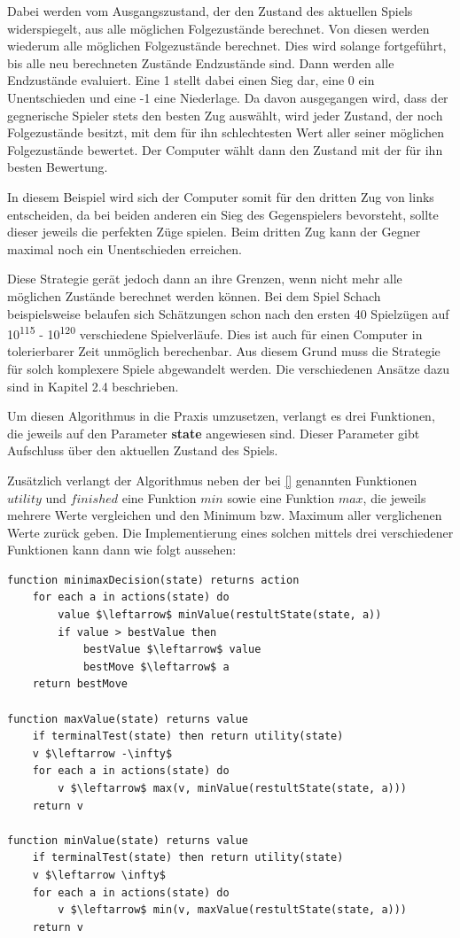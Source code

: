 Dabei werden vom Ausgangszustand, der den Zustand des aktuellen Spiels widerspiegelt, aus alle möglichen Folgezustände berechnet. Von diesen werden wiederum alle möglichen Folgezustände berechnet. Dies wird solange fortgeführt, bis alle neu berechneten Zustände Endzustände sind. Dann werden alle Endzustände evaluiert. Eine 1 stellt dabei einen Sieg dar, eine 0 ein Unentschieden und eine -1 eine Niederlage. Da davon ausgegangen wird, dass der gegnerische Spieler stets den besten Zug auswählt, wird jeder Zustand, der noch Folgezustände besitzt, mit dem für ihn schlechtesten Wert aller seiner möglichen Folgezustände bewertet. Der Computer wählt dann den Zustand mit der für ihn besten Bewertung.

In diesem Beispiel wird sich der Computer somit für den dritten Zug von links entscheiden, da bei beiden anderen ein Sieg des Gegenspielers bevorsteht, sollte dieser jeweils die perfekten Züge spielen. Beim dritten Zug kann der Gegner maximal noch ein Unentschieden erreichen.

Diese Strategie gerät jedoch dann an ihre Grenzen, wenn nicht mehr alle möglichen Zustände berechnet werden können. Bei dem Spiel Schach beispielsweise belaufen sich Schätzungen schon nach den ersten 40 Spielzügen auf 10\textsuperscript{115} - 10\textsuperscript{120} verschiedene Spielverläufe. Dies ist auch für einen Computer in tolerierbarer  Zeit unmöglich berechenbar. Aus diesem Grund muss die Strategie für solch komplexere Spiele abgewandelt werden. Die verschiedenen Ansätze dazu sind in Kapitel 2.4 beschrieben.


Um diesen Algorithmus in die Praxis umzusetzen, verlangt es drei Funktionen, die jeweils auf den Parameter \textbf{state} angewiesen sind. Dieser Parameter gibt Aufschluss über den aktuellen Zustand des Spiels.

Zusätzlich verlangt der Algorithmus neben der bei \ref{} genannten Funktionen $utility$ und $finished$ eine Funktion $min$ sowie eine Funktion $max$, die jeweils mehrere Werte vergleichen und den Minimum bzw. Maximum aller verglichenen Werte zurück geben. Die Implementierung eines solchen mittels drei verschiedener Funktionen kann dann wie folgt aussehen:

\begin{lstlisting}[mathescape]
function minimaxDecision(state) returns action
	for each a in actions(state) do
		value $\leftarrow$ minValue(restultState(state, a))
		if value > bestValue then
			bestValue $\leftarrow$ value
			bestMove $\leftarrow$ a
	return bestMove
	
function maxValue(state) returns value
	if terminalTest(state) then return utility(state)
	v $\leftarrow -\infty$
	for each a in actions(state) do
		v $\leftarrow$ max(v, minValue(restultState(state, a)))
	return v
	
function minValue(state) returns value
	if terminalTest(state) then return utility(state)
	v $\leftarrow \infty$
	for each a in actions(state) do
		v $\leftarrow$ min(v, maxValue(restultState(state, a)))
	return v
\end{lstlisting}


